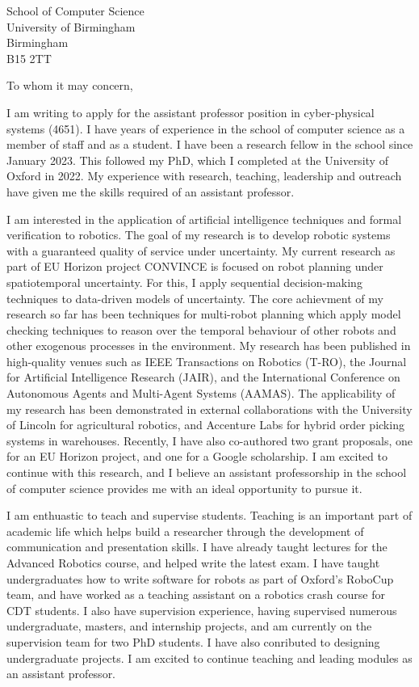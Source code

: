 \documentclass[12pt]{letter}
\begin{document}
\begin{letter}{School of Computer Science \\ University of Birmingham \\ Birmingham \\ B15 2TT}
\opening{To whom it may concern,}


I am writing to apply for the assistant professor position in cyber-physical systems (4651).
%
I have years of experience in the school of computer science as a member of staff and as a student.
%
I have been a research fellow in the school since January 2023.
%
This followed my PhD, which I completed at the University of Oxford in 2022.
%
My experience with research, teaching, leadership and outreach have given me the skills required of an assistant professor.



I am interested in the application of artificial intelligence techniques and formal verification to robotics.
%
The goal of my research is to develop robotic systems with a guaranteed quality of service under uncertainty.
%
My current research as part of EU Horizon project CONVINCE is focused on robot planning under spatiotemporal uncertainty.
%
For this, I apply sequential decision-making techniques to data-driven models of uncertainty.
%
The core achievment of my research so far has been techniques for multi-robot planning which apply model checking techniques to reason over the temporal behaviour of other robots and other exogenous processes in the environment.
%
My research has been published in high-quality venues such as IEEE Transactions on Robotics (T-RO), the Journal for Artificial Intelligence Research (JAIR), and the International Conference on Autonomous Agents and Multi-Agent Systems (AAMAS).
%
The applicability of my research has been demonstrated in external collaborations with the University of Lincoln for agricultural robotics, and Accenture Labs for hybrid order picking systems in warehouses.
%
Recently, I have also co-authored two grant proposals, one for an EU Horizon project, and one for a Google scholarship.
%
I am excited to continue with this research, and I believe an assistant professorship in the school of computer science provides me with an ideal opportunity to pursue it.

I am enthuastic to teach and supervise students.
%
Teaching is an important part of academic life which helps build a researcher through the development of communication and presentation skills.
%
I have already taught lectures for the Advanced Robotics course, and helped write the latest exam.
%
I have taught undergraduates how to write software for robots as part of Oxford's RoboCup team, and have worked as a teaching assistant on a robotics crash course for CDT students.
%
I also have supervision experience, having supervised numerous undergraduate, masters, and internship projects, and am currently on the supervision team for two PhD students.
%
I have also conributed to designing undergraduate projects.
%
I am excited to continue teaching and leading modules as an assistant professor.


\end{letter}
\end{document}
